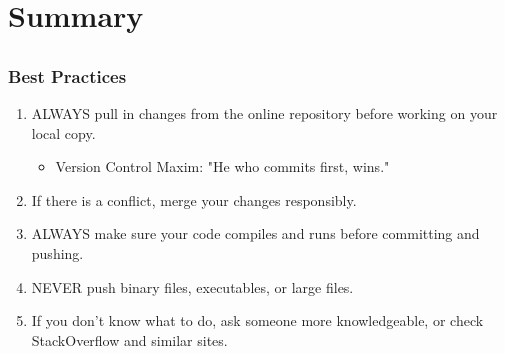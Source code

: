 \documentclass[]{beamer}
\begin{document}
\section{Summary}
\subsection{}
\begin{frame}[t]\frametitle{Best Practices}
  \begin{block}{}
    \begin{enumerate}
      \item ALWAYS pull in changes from the online repository before working on your local copy. 
        \begin{itemize}
          \item Version Control Maxim: "He who commits first, wins."
        \end{itemize}
      \item If there is a conflict, merge your changes responsibly.
      \item ALWAYS make sure your code compiles and runs before committing and pushing.
      \item NEVER push binary files, executables, or large files. 
      \item If you don't know what to do, ask someone more knowledgeable, or check StackOverflow and similar sites.
    \end{enumerate}
  \end{block}
\end{frame}
\end{document}
